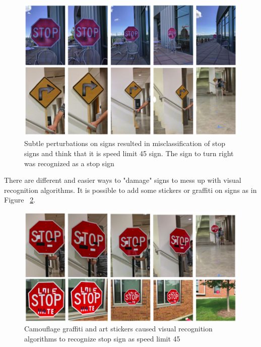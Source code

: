 \begin{figure}[h]
	\centering  	
	\includegraphics[width=13cm]{img/perturbedsigns.png}
	\caption{Subtle perturbations on signs resulted in misclassification of stop signs and think that it is speed limit 45 sign. The sign to turn right was recognized as a stop sign \cite{signs}}
	\label{fig:perturbedsigns}    
\end{figure}

There are different and easier ways to "damage" signs to mess up with visual recognition algorithms. It is possible to add some stickers or graffiti on signs as in  Figure ~\ref{fig:stickersigns}.

\begin{figure}[h!]
	\centering  	
	\includegraphics[width=13cm]{img/stickerSign.png}
	\caption{Camouflage graffiti and art stickers caused visual recognition algorithms to recognize stop sign as speed limit 45 \cite{signs}}
	\label{fig:stickersigns}    
\end{figure}

